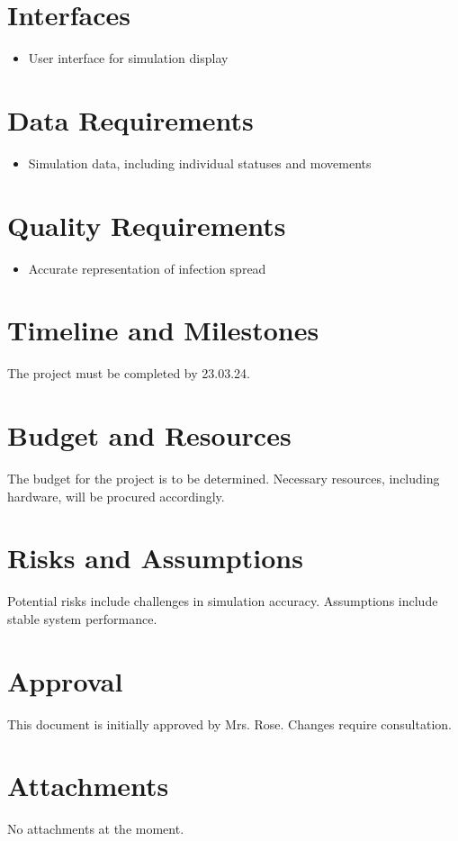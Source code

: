 \documentclass{article}
\begin{document}
	\section{Interfaces}
	\begin{itemize}
		\item User interface for simulation display
	\end{itemize}
	
	\section{Data Requirements}
	\begin{itemize}
		\item Simulation data, including individual statuses and movements
	\end{itemize}
	
	\section{Quality Requirements}
	\begin{itemize}
		\item Accurate representation of infection spread
	\end{itemize}
	
	\section{Timeline and Milestones}
	The project must be completed by 23.03.24.
	
	\section{Budget and Resources}
	The budget for the project is to be determined. Necessary resources, including hardware, will be procured accordingly.
	
	\section{Risks and Assumptions}
	Potential risks include challenges in simulation accuracy. Assumptions include stable system performance.
	
	\section{Approval}
	This document is initially approved by Mrs. Rose. Changes require consultation.
	
	\section{Attachments}
	No attachments at the moment.
	
\end{document}
